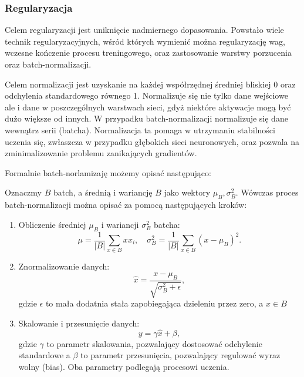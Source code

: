 \subsubsection{Regularyzacja}
Celem regularyzacji jest uniknięcie nadmiernego dopasowania. Powstało wiele technik regularyzacyjnych, wśród których wymienić można regularyzację wag, wczesne kończenie procesu treningowego, oraz zastosowanie warstwy porzucenia  oraz batch-normalizacji.
\par
Celem normalizacji jest uzyskanie na każdej współrzędnej średniej bliskiej 0 oraz odchylenia standardowego równego 1. Normalizuje się nie tylko dane wejściowe ale i dane w poszczególnych warstwach sieci, gdyż niektóre aktywacje mogą być dużo większe od innych. W przypadku batch-normalizacji normalizuje się dane wewnątrz serii (batcha). Normalizacja ta pomaga w utrzymaniu stabilności uczenia się, zwłaszcza w przypadku głębokich sieci neuronowych, oraz pozwala na zminimalizowanie problemu zanikających gradientów.
\par
Formalnie batch-norlamizaję możemy opisać następująco:
\par
Oznaczmy \(B\) batch, a średnią i wariancję $B$ jako wektory $\mu_B, \sigma_B^2$. Wówczas proces batch-normalizacji można opisać za pomocą następujących kroków:

\begin{enumerate}
    \item Obliczenie średniej \(\mu_B\) i wariancji \(\sigma_B^2\) batcha:
    \begin{equation*}
        \mu = \frac{1}{|B|} \sum_{x \in B}x x_i, \quad \sigma^2_B = \frac{1}{|B|} \sum_{x \in B} (x - \mu_B)^2.
    \end{equation*}
    
    \item Znormalizowanie danych:
    \begin{equation*}
        \hat{x} = \frac{x - \mu_B}{\sqrt{\sigma^2_B + \epsilon}},
    \end{equation*}
    gdzie \(\epsilon\) to mała dodatnia stała zapobiegająca dzieleniu przez zero, a $x \in B$
    
    \item Skalowanie i przesunięcie danych:
    \begin{equation*}
        y = \gamma \hat{x} + \beta,
    \end{equation*}
    gdzie \(\gamma\) to parametr skalowania, pozwalający dostosować odchylenie standardowe a \(\beta\) to parametr przesunięcia, pozwalający regulować wyraz wolny (bias). Oba parametry podlegają procesowi uczenia\cite{ioffe2015batch}.
\end{enumerate}